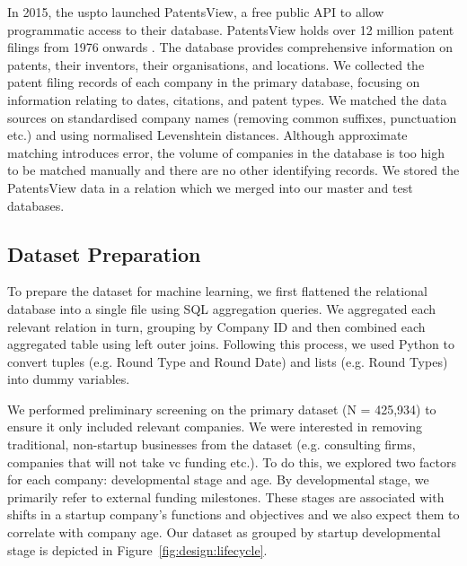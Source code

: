 \documentclass[../thesis/thesis.tex]{subfiles}
\begin{document}
In 2015, the \gls{uspto} launched PatentsView, a free public API to allow programmatic access to their database. PatentsView holds over 12 million patent filings from 1976 onwards \cite{schultz2016}. The database provides comprehensive information on patents, their inventors, their organisations, and locations. We collected the patent filing records of each company in the primary database, focusing on information relating to dates, citations, and patent types. We matched the data sources on standardised company names (removing common suffixes, punctuation etc.) and using normalised Levenshtein distances. Although approximate matching introduces error, the volume of companies in the database is too high to be matched manually and there are no other identifying records. We stored the PatentsView data in a relation which we merged into our master and test databases.

\subsection{Dataset Preparation}

To prepare the dataset for machine learning, we first flattened the relational database into a single file using SQL aggregation queries. We aggregated each relevant relation in turn, grouping by Company ID and then combined each aggregated table using left outer joins. Following this process, we used Python to convert tuples (e.g. Round Type and Round Date) and lists (e.g. Round Types) into dummy variables.

We performed preliminary screening on the primary dataset (N = 425,934) to ensure it only included relevant companies. We were interested in removing traditional, non-startup businesses from the dataset (e.g. consulting firms, companies that will not take \gls{vc} funding etc.). To do this, we explored two factors for each company: developmental stage and age. By developmental stage, we primarily refer to external funding milestones. These stages are associated with shifts in a startup company's functions and objectives and we also expect them to correlate with company age. Our dataset as grouped by startup developmental stage is depicted in Figure~\ref{fig:design:lifecycle}.
\end{document}
